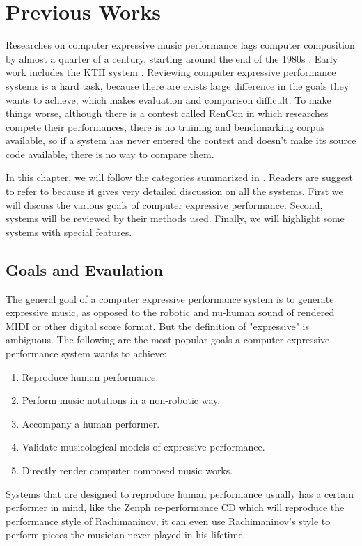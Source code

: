\chapter{Previous Works}
Researches on computer expressive music performance lags computer composition by almost a quarter of a century, starting around the end of the 1980s \cite{THEBOOK}. Early work includes the KTH system \cite{THEBOOK}. Reviewing computer expressive performance systems is a hard task, because there are exists large difference in the goals they wants to achieve, which makes evaluation and comparison difficult. To make things worse, although there is a contest called RenCon \cite{RenCon} in which researches compete their performances, there is no training and benchmarking corpus available, so if a system has never entered the contest and doesn't make its source code available, there is no way to compare them.

In this chapter, we will follow the categories summarized in \cite{THEBOOK}. Readers are suggest to refer to \cite{THEBOOK} because it gives very detailed discussion on all the systems. First we will discuss the various goals of computer expressive performance. Second, systems will be reviewed by their methods used. Finally, we will highlight some systems with special features.

\section{Goals and Evaulation}
The general goal of a computer expressive performance system is to generate expressive music, as opposed to the robotic and nu-human sound of rendered MIDI or other digital score format. But the definition of "expressive" is ambiguous. The following are the most popular goals a computer expressive performance system wants to achieve:
\begin{enumerate}
   \item Reproduce human performance.
   \item Perform music notations in a non-robotic way.
   \item Accompany a human performer.
   \item Validate musicological models of expressive performance.
   \item Directly render computer composed music works.
\end{enumerate}

Systems that are designed to reproduce human performance usually has a certain performer in mind, like the Zenph re-performance CD \cite{zenph} which will reproduce the performance style of Rachimaninov, it can even use Rachimaninov's style to perform pieces the musician never played in his lifetime. 

